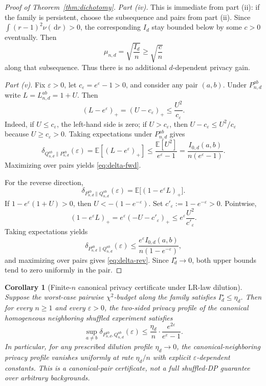 \documentclass[11pt]{amsart}
\numberwithin{equation}{section}
\newtheorem{corollary}[theorem]{Corollary}
\theoremstyle{definition}
\newcommand{\E}{\mathbb E}
\newcommand{\dd}{\,\mathrm d}
\begin{document}
\begin{proof}[Proof of Theorem~\ref{thm:dichotomy}]
\smallskip
\noindent\emph{Part (iv).}
This is immediate from part (ii):
if the family is persistent, choose the subsequence and pairs from part (ii).  Since
\(
\int (r-1)^2 \nu(\dd r)>0
\),
the corresponding $I_d$ stay bounded below by some \(c>0\) eventually.
Then
\[
\mu_{n,d}=\sqrt{\frac{I_d}{n}}\ge \sqrt{\frac{c}{n}}
\]
along that subsequence.  Thus there is no additional $d$-dependent privacy gain.

\smallskip
\noindent\emph{Part (v).}
Fix \(\varepsilon>0\), let \(c_\varepsilon=e^\varepsilon-1>0\), and consider any pair $(a,b)$.
Under $P_{n,d}^{ab}$ write \(L=L_{n,d}^{ab}=1+U\).
Then
\[
(L-e^\varepsilon)_+
=
(U-c_\varepsilon)_+
\le \frac{U^2}{c_\varepsilon}. \tag{6.22}\label{eq:fwd-pointwise}
\]
Indeed, if \(U\le c_\varepsilon\), the left-hand side is zero; if \(U>c_\varepsilon\), then
\(
U-c_\varepsilon\le U^2/c_\varepsilon
\)
because \(U\ge c_\varepsilon>0\).
Taking expectations under $P_{n,d}^{ab}$ gives
\[
\delta_{Q_{n,d}^{ab}\|P_{n,d}^{ab}}(\varepsilon)
=
\E[(L-e^\varepsilon)_+]
\le
\frac{\E[U^2]}{e^\varepsilon-1}
=
\frac{I_{0,d}(a,b)}{n(e^\varepsilon-1)}.
\]
Maximizing over pairs yields \eqref{eq:delta-fwd}.

For the reverse direction,
\[
\delta_{P_{n,d}^{ab}\|Q_{n,d}^{ab}}(\varepsilon)
=
\E\bigl[(1-e^\varepsilon L)_+\bigr].
\]
If \(1-e^\varepsilon(1+U)>0\), then
\(
U<-(1-e^{-\varepsilon})
\).
Set \(c'_\varepsilon:=1-e^{-\varepsilon}>0\).
Pointwise,
\[
(1-e^\varepsilon L)_+
=
e^\varepsilon(-U-c'_\varepsilon)_+
\le
e^\varepsilon \frac{U^2}{c'_\varepsilon}. \tag{6.23}\label{eq:rev-pointwise}
\]
Taking expectations yields
\[
\delta_{P_{n,d}^{ab}\|Q_{n,d}^{ab}}(\varepsilon)
\le
\frac{e^\varepsilon I_{0,d}(a,b)}{n(1-e^{-\varepsilon})},
\]
and maximizing over pairs gives \eqref{eq:delta-rev}.
Since \(I_d^\star\to0\), both upper bounds tend to zero uniformly in the pair.
\end{proof}

\begin{corollary}[Finite-$n$ canonical privacy certificate under LR-law dilution]\label{cor:finite-n-cert}
Suppose the worst-case pairwise $\chi^2$-budget along the family satisfies
$I_d^\star\le \eta_d$.  Then for every $n\ge 1$ and every $\varepsilon>0$, the two-sided privacy
profile of the canonical homogeneous neighboring shuffled experiment satisfies
\[
\sup_{a\neq b}\delta_{P_{n,d}^{ab},Q_{n,d}^{ab}}(\varepsilon)
\le
\frac{\eta_d}{n}\cdot\frac{e^{2\varepsilon}}{e^\varepsilon-1}.
\]
In particular, for any prescribed dilution profile $\eta_d\to 0$, the canonical-neighboring privacy
profile vanishes uniformly at rate $\eta_d/n$ with explicit $\varepsilon$-dependent constants.
This is a canonical-pair certificate, not a full shuffled-DP guarantee over arbitrary backgrounds.
\end{corollary}
\end{document}
